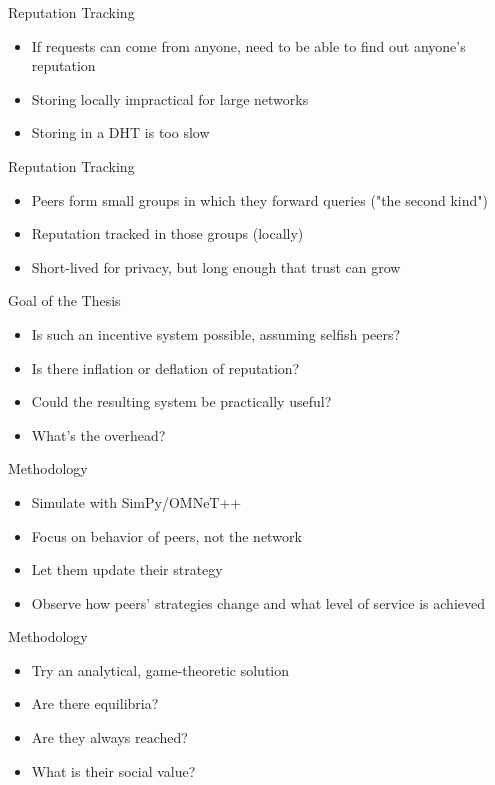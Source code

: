 \documentclass[presentation,english]{beamer}
\begin{document}
\begin{frame}{Reputation Tracking}
  \begin{itemize}
    \item If requests can come from anyone, need to be able to find out anyone's
          reputation
    \item Storing locally impractical for large networks
    \item Storing in a DHT is too slow
  \end{itemize}
\end{frame}

\begin{frame}{Reputation Tracking}
  \begin{itemize}
    \item Peers form small groups in which they forward queries ("the second
          kind")
    \item Reputation tracked in those groups (locally)
    \item Short-lived for privacy, but long enough that trust can grow
  \end{itemize}
\end{frame}

\begin{frame}{Goal of the Thesis}
  \begin{itemize}
    \item Is such an incentive system possible, assuming selfish peers?
    \item Is there inflation or deflation of reputation?
    \item Could the resulting system be practically useful?
    \item What's the overhead?
  \end{itemize}
\end{frame}

\begin{frame}{Methodology}
  \begin{itemize}
    \item Simulate with SimPy/OMNeT++
    \item Focus on behavior of peers, not the network
    \item Let them update their strategy
    \item Observe how peers' strategies change and what level of service is
          achieved
  \end{itemize}
\end{frame}

\begin{frame}{Methodology}
  \begin{itemize}
    \item Try an analytical, game-theoretic solution
    \item Are there equilibria?
    \item Are they always reached?
    \item What is their social value?
  \end{itemize}
\end{frame}
\end{document}
